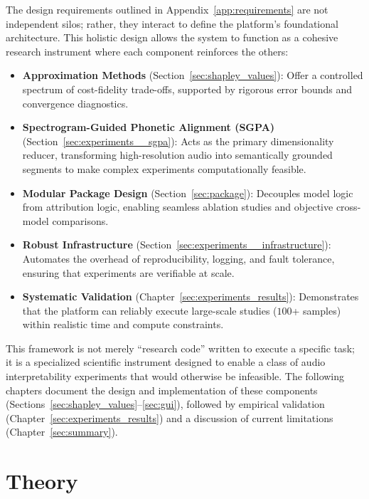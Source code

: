 The design requirements outlined in Appendix~\ref{app:requirements} are not independent silos; rather, they interact to define the platform’s foundational architecture. This holistic design allows the system to function as a cohesive research instrument where each component reinforces the others:

\begin{itemize}
    \item \textbf{Approximation Methods} (Section~\ref{sec:shapley_values}): Offer a controlled spectrum of cost-fidelity trade-offs, supported by rigorous error bounds and convergence diagnostics.

    \item \textbf{Spectrogram-Guided Phonetic Alignment (SGPA)} (Section~\ref{sec:experiments__sgpa}): Acts as the primary dimensionality reducer, transforming high-resolution audio into semantically grounded segments to make complex experiments computationally feasible.

    \item \textbf{Modular Package Design} (Section~\ref{sec:package}): Decouples model logic from attribution logic, enabling seamless ablation studies and objective cross-model comparisons.

    \item \textbf{Robust Infrastructure} (Section~\ref{sec:experiments__infrastructure}): Automates the overhead of reproducibility, logging, and fault tolerance, ensuring that experiments are verifiable at scale.

    \item \textbf{Systematic Validation} (Chapter~\ref{sec:experiments_results}): Demonstrates that the platform can reliably execute large-scale studies ($100$+ samples) within realistic time and compute constraints.
\end{itemize}

\noindent This framework is not merely ``research code'' written to execute a specific task; it is a specialized scientific instrument designed to enable a class of audio interpretability experiments that would otherwise be infeasible. The following chapters document the design and implementation of these components (Sections~\ref{sec:shapley_values}--\ref{sec:gui}), followed by empirical validation (Chapter~\ref{sec:experiments_results}) and a discussion of current limitations (Chapter~\ref{sec:summary}).


\chapter{Theory}
\label{sec:theory}

